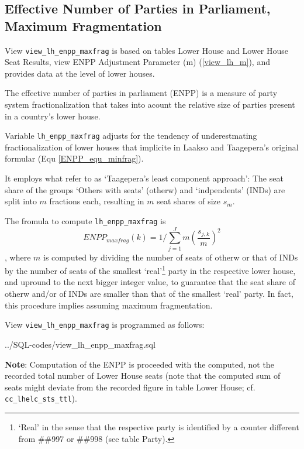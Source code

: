 \subsection{Effective Number of Parties in Parliament, Maximum Fragmentation}\label{view_lh_enpp_maxfrag}
View \texttt{\footnotesize view\_lh\_enpp\_maxfrag} is based on tables Lower House and Lower House Seat Results, view ENPP Adjustment Parameter (m) (\ref{view_lh_m}), and provides data at the level of lower houses.

The effective number of parties in parliament (ENPP) is a measure of party system fractionalization that takes into acount the relative size of parties present in a country's lower house. 

Variable \texttt{\footnotesize lh\_enpp\_maxfrag} adjusts for the tendency of underestmating fractionalization of lower houses that implicite in Laakso and Taagepera's original formular (Equ \ref{ENPP_equ_minfrag}). 

It employs what \citet[pp.\,600-602]{Gallagher&Mitchell2005} refer to as `Taagepera's least component approach': The seat share of the groups `Others with seats' (otherw) and `indpendents' (INDs) are split into $m$ fractions each, resulting in $m$ seat shares of size $s_{m}$. 

The fromula to compute \texttt{\footnotesize lh\_enpp\_maxfrag} is
\begin{equation}\label{ENPP_equ_maxfrag}
ENPP_{maxfrag}(k) = 1/\sum\limits_{j=1}^{J}m\left(\frac{s_{j,k}}{m}\right)^{2}
\end{equation} 
, where $m$ is computed by dividing the number of seats of otherw or that of INDs by the number of seats of the smallest `real'\footnote{`Real' in the sense that the respective party is identified by a counter different from \#\#997 or \#\#998 (see table Party).} party in the respective lower house, and upround to the next bigger integer value, to guarantee that the seat share of otherw and/or of INDs are smaller than that of the smallest `real' party. In fact, this procedure implies assuming maximum fragmentation.

View \texttt{\footnotesize view\_lh\_enpp\_maxfrag} is programmed as follows:

%
{../SQL-codes/view_lh_enpp_maxfrag.sql}

{\bf Note}: Computation of the ENPP is proceeded with the computed, not the recorded total number of Lower House seats (note that the computed sum of seats might deviate from the recorded figure in table Lower House; cf. \texttt{\footnotesize cc\_lhelc\_sts\_ttl}).

